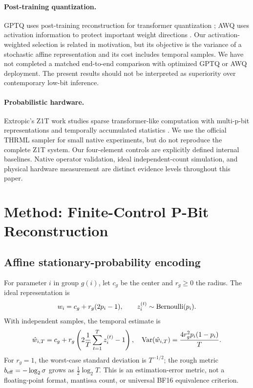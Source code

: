 \documentclass[11pt]{article}
\begin{document}
\paragraph{Post-training quantization.}
GPTQ uses post-training reconstruction for transformer quantization \citep{frantar2023}; AWQ uses activation information to protect important weight directions \citep{lin2024}. Our activation-weighted selection is related in motivation, but its objective is the variance of a stochastic affine representation and its cost includes temporal samples. We have not completed a matched end-to-end comparison with optimized GPTQ or AWQ deployment. The present results should not be interpreted as superiority over contemporary low-bit inference.

\paragraph{Probabilistic hardware.}
Extropic's Z1T work studies sparse transformer-like computation with multi-p-bit representations and temporally accumulated statistics \citep{extropic2026z1t}. We use the official THRML sampler for small native experiments, but do not reproduce the complete Z1T system. Our four-element controls are explicitly defined internal baselines. Native operator validation, ideal independent-count simulation, and physical hardware measurement are distinct evidence levels throughout this paper.

\section{Method: Finite-Control P-Bit Reconstruction}
\subsection{Affine stationary-probability encoding}
For parameter $i$ in group $g(i)$, let $c_g$ be the center and $r_g\geq0$ the radius. The ideal representation is
\begin{equation}
 w_i=c_g+r_g(2p_i-1),\qquad z_i^{(t)}\sim\operatorname{Bernoulli}(p_i).
 \label{eq:encoding}
\end{equation}
With independent samples, the temporal estimate is
\begin{equation}
 \hat w_{i,T}=c_g+r_g\left(2\frac{1}{T}\sum_{t=1}^T z_i^{(t)}-1\right),
 \quad \operatorname{Var}(\hat w_{i,T})=\frac{4r_g^2p_i(1-p_i)}{T}.
 \label{eq:variance}
\end{equation}
For $r_g=1$, the worst-case standard deviation is $T^{-1/2}$; the rough metric $b_{\rm eff}=-\log_2\sigma$ grows as $\tfrac12\log_2 T$. This is an estimation-error metric, not a floating-point format, mantissa count, or universal BF16 equivalence criterion.
\end{document}
